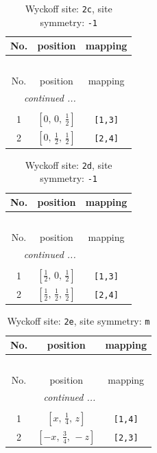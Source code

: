 \documentclass[fleqn,8pt]{jsarticle}
\begin{document}
\begin{longtable}{ccc}
\caption{Wyckoff site: {\tt 2c}, site symmetry: {\tt -1}}
 \\
 \hline \hline
No. & position & mapping \\ \hline \endfirsthead

\multicolumn{2}{l}{\tablename\ \thetable{}} \\
 \hline \hline
No. & position & mapping \\ \hline \endhead

 \hline \hline
\multicolumn{2}{r}{\footnotesize\it continued ...} \\ \endfoot

 \hline \hline
\multicolumn{2}{r}{} \\ \endlastfoot

1 & $\left[ 0,\, 0,\, \frac{1}{2} \right]$ & {\tt [1,3]} \\ \hline
2 & $\left[ 0,\, \frac{1}{2},\, \frac{1}{2} \right]$ & {\tt [2,4]} \\
\end{longtable}
\renewcommand{\arraystretch}{1.2}
\begin{longtable}{ccc}
\caption{Wyckoff site: {\tt 2d}, site symmetry: {\tt -1}}
 \\
 \hline \hline
No. & position & mapping \\ \hline \endfirsthead

\multicolumn{2}{l}{\tablename\ \thetable{}} \\
 \hline \hline
No. & position & mapping \\ \hline \endhead

 \hline \hline
\multicolumn{2}{r}{\footnotesize\it continued ...} \\ \endfoot

 \hline \hline
\multicolumn{2}{r}{} \\ \endlastfoot

1 & $\left[ \frac{1}{2},\, 0,\, \frac{1}{2} \right]$ & {\tt [1,3]} \\ \hline
2 & $\left[ \frac{1}{2},\, \frac{1}{2},\, \frac{1}{2} \right]$ & {\tt [2,4]} \\
\end{longtable}
\renewcommand{\arraystretch}{1.2}
\begin{longtable}{ccc}
\caption{Wyckoff site: {\tt 2e}, site symmetry: {\tt m}}
 \\
 \hline \hline
No. & position & mapping \\ \hline \endfirsthead

\multicolumn{2}{l}{\tablename\ \thetable{}} \\
 \hline \hline
No. & position & mapping \\ \hline \endhead

 \hline \hline
\multicolumn{2}{r}{\footnotesize\it continued ...} \\ \endfoot

 \hline \hline
\multicolumn{2}{r}{} \\ \endlastfoot

1 & $\left[ x,\, \frac{1}{4},\, z \right]$ & {\tt [1,4]} \\ \hline
2 & $\left[ - x,\, \frac{3}{4},\, - z \right]$ & {\tt [2,3]} \\
\end{longtable}
\end{document}

